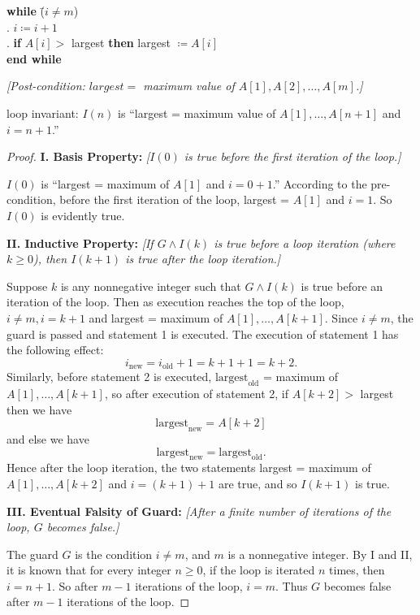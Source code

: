 \documentclass[14pt]{extarticle}
\begin{document}
\begin{tabbing}
{\bf while} \= ($i \neq m$) \\
            . $i \coloneqq i + 1$ \\
            . {\bf if} $A[i] > $ largest {\bf then} largest $\coloneqq A[i]$ \\
{\bf end while}
\end{tabbing}

{\it [Post-condition: $largest = $ maximum value of $A[1], A[2], \ldots, A[m]$.]}

loop invariant: $I(n)$ is ``largest = maximum value of $A[1], \ldots, A[n+1]$ and $i = n + 1$.''

\begin{proof}
{\bf I. Basis Property:} {\it [$I(0)$ is true before the first iteration of the loop.]}

$I(0)$ is “largest = maximum of $A[1]$ and $i = 0+1$.” 
According to the pre-condition, before the first iteration of the loop, largest = $A[1]$ and $i = 1$. 
So $I(0)$ is evidently true.

{\bf II. Inductive Property:} {\it [If $G \wedge I(k)$ is true before a loop iteration (where $k \geq 0$), then 
$I(k + 1)$ is true after the loop iteration.]} 

Suppose $k$ is any nonnegative integer such that $G \wedge I(k)$ is true before an iteration of the loop. Then as 
execution reaches the top of the loop, $i \neq m, i = k+1$ and largest = maximum of $A[1], \ldots, A[k+1]$. 
Since $i \neq m$, the guard is passed and statement 1 is executed. The execution of statement 1 has the following effect: 
\[
i_{\text{new}} = i_{\text{old}} + 1 = k + 1 + 1 = k + 2.
\]
Similarly, before statement 2 is executed, $\text{largest}_{\text{old}}$ = maximum of $A[1], \ldots, A[k+1]$, so
after execution of statement 2, if $A[k+2] > $ largest then we have
\[
\text{largest}_{\text{new}} = A[k+2]
\]
and else we have
\[
\text{largest}_{\text{new}} = \text{largest}_{\text{old}}.
\]
Hence after the loop iteration, the two statements largest = maximum of $A[1], \ldots, A[k+2]$ and $i = (k + 1) + 1$ 
are true, and so $I(k + 1)$ is true.

{\bf III. Eventual Falsity of Guard:} {\it [After a finite number of iterations of the loop, $G$ becomes false.]} 

The guard $G$ is the condition $i \neq m$, and $m$ is a nonnegative integer. By I and II, it is known that for 
every integer $n \geq 0$, if the loop is iterated $n$ times, then $i = n + 1$. So after $m-1$ iterations of the 
loop, $i = m$. Thus $G$ becomes false after $m-1$ iterations of the loop. 


\end{proof}
\end{document}
